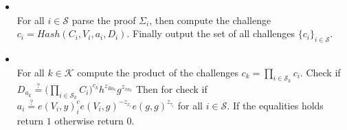 \begin{algorithm}[]
\begin{itemize}
\item {}\\
For all $i\in\mathcal{S}$ parse the proof $\Sigma_i$, then compute the challenge $c_i = Hash(C_i,V_i,a_i,D_i)$. Finally output the set of all challenges $\{c_i\}_{i\in\mathcal{S}}$. 

\item{} \\
For all $k\in\mathcal{K}$ compute the product of the challenges $c_k=\prod_{i\in\mathcal{S}_k} c_i$. Check if $D_{a_k}\overset{?}{=} \big( \prod_{i\in\mathcal{S}_k} C_i\big)^{c_k}h^{z_{R{a_k}}}g^{z_{x{a_k}}}$ 
Then for check if $ a_i \overset{?}{=} e(V_i,y)^c_i e(V_i,g)^{-z_{x_i}}e(g,g)^{z_{\tau_i}}$ for all $i\in\mathcal{S}$. If the equalities holds return $1$ otherwise return $0$.
\end{itemize}
\label{alg:ZKSM-Agg-Many}
\end{algorithm} 
